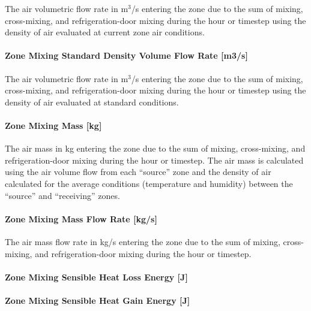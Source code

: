 The air volumetric flow rate in m\(^{3}\)/s entering the zone due to the sum of mixing, cross-mixing, and refrigeration-door mixing during the hour or timestep using the density of air evaluated at current zone air conditions.

\paragraph{Zone Mixing Standard Density Volume Flow Rate {[}m3/s{]}}\label{zone-mixing-standard-density-volumetric-flow-rate-m3s-2}

The air volumetric flow rate in m\(^{3}\)/s entering the zone due to the sum of mixing, cross-mixing, and refrigeration-door mixing during the hour or timestep using the density of air evaluated at standard conditions.

\paragraph{Zone Mixing Mass {[}kg{]}}\label{zone-mixing-mass-kg-2}

The air mass in kg entering the zone due to the sum of mixing, cross-mixing, and refrigeration-door mixing during the hour or timestep. The air mass is calculated using the air volume flow from each ``source'' zone and the density of air calculated for the average conditions (temperature and humidity) between the ``source'' and ``receiving'' zones.

\paragraph{Zone Mixing Mass Flow Rate {[}kg/s{]}}\label{zone-mixing-mass-flow-rate-kgs-2}

The air mass flow rate in kg/s entering the zone due to the sum of mixing, cross-mixing, and refrigeration-door mixing during the hour or timestep.

\paragraph{Zone Mixing Sensible Heat Loss Energy {[}J{]}}\label{zone-mixing-sensible-heat-loss-energy-j-2}

\paragraph{Zone Mixing Sensible Heat Gain Energy {[}J{]}}\label{zone-mixing-sensible-heat-gain-energy-j-2}

